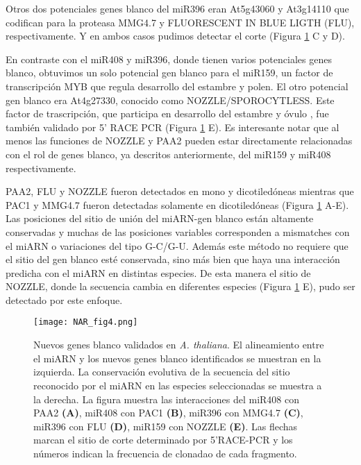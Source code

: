 Otros dos potenciales genes blanco del miR396 eran At5g43060 y At3g14110 que codifican para la proteasa MMG4.7 y FLUORESCENT IN BLUE LIGTH (FLU), respectivamente.
Y en ambos casos pudimos detectar el corte (Figura \ref{fig:NAR_fig4} C y D).


En contraste con el miR408 y miR396, donde tienen varios potenciales genes blanco, obtuvimos un solo potencial gen blanco para el miR159, un factor de transcripción MYB que regula desarrollo del estambre y polen. \citep{Millar2005}
El otro potencial gen blanco era At4g27330, conocido como NOZZLE/SPOROCYTLESS.
Este factor de trascripción, que participa en desarrollo del estambre y óvulo \citep{Biology1999,Yang1999}, fue también validado por 5' RACE PCR (Figura \ref{fig:NAR_fig4} E).
Es interesante notar que al menos las funciones de NOZZLE y PAA2 pueden estar directamente relacionadas con el rol de genes blanco, ya descritos anteriormente, del miR159 y miR408 respectivamente.

PAA2, FLU y NOZZLE fueron detectados en mono y dicotiledóneas mientras que PAC1 y MMG4.7 fueron detectadas solamente en dicotiledóneas (Figura \ref{fig:NAR_fig4} A-E).
Las posiciones del sitio de unión del miARN-gen blanco están altamente conservadas y muchas de las posiciones variables corresponden a mismatches con el miARN o variaciones del tipo G-C/G-U.
Además este método no requiere que el sitio del gen blanco esté conservada, sino más bien que haya una interacción predicha con el miARN en distintas especies.
De esta manera el sitio de NOZZLE, donde la secuencia cambia en diferentes especies (Figura \ref{fig:NAR_fig4} E), pudo ser detectado por este enfoque.

\begin{figure}[htbp!] 
    \centering    
    \texttt{[image: NAR\_fig4.png]}
    \caption[]{Nuevos genes blanco validados en \textit{A. thaliana}. 
    El alineamiento entre el miARN y los nuevos genes blanco identificados se muestran en la izquierda.
    La conservación evolutiva de la secuencia del sitio reconocido por el miARN en las especies seleccionadas se muestra a la derecha. La figura muestra las interacciones del miR408 con PAA2
    \textbf{(A)}, miR408 con PAC1 \textbf{(B)}, miR396 con MMG4.7 \textbf{(C)}, miR396 con FLU \textbf{(D)}, miR159 con NOZZLE \textbf{(E)}.
    Las flechas marcan el sitio de corte determinado por 5’RACE-PCR y los números indican la frecuencia de clonadao de cada fragmento.}
    \label{fig:NAR_fig4}
\end{figure}


